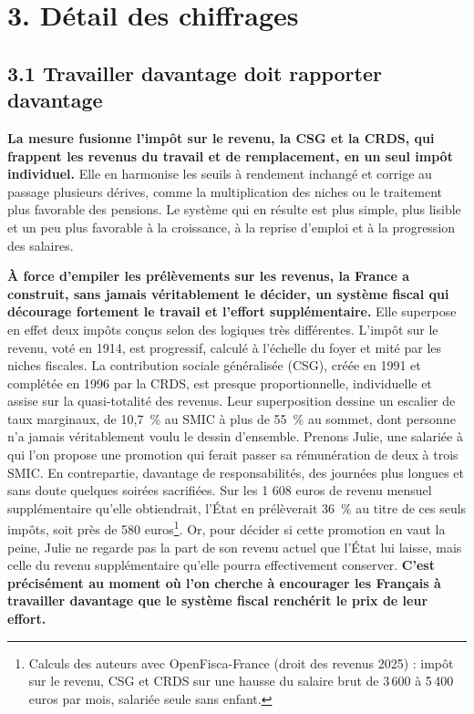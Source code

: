 \documentclass[10pt,a4paper]{article}
\begin{document}
\section{3. Détail des chiffrages}

\subsection{3.1 Travailler davantage doit rapporter davantage}

\textbf{La mesure fusionne l'impôt sur le revenu, la CSG et la CRDS, qui frappent les revenus du travail et de remplacement, en un seul impôt individuel.} Elle en harmonise les seuils à rendement inchangé et corrige au passage plusieurs dérives, comme la multiplication des niches ou le traitement plus favorable des pensions. Le système qui en résulte est plus simple, plus lisible et un peu plus favorable à la croissance, à la reprise d'emploi et à la progression des salaires.

\textbf{À force d’empiler les prélèvements sur les revenus, la France a construit, sans jamais véritablement le décider, un système fiscal qui décourage fortement le travail et l’effort supplémentaire.} Elle superpose en effet deux impôts conçus selon des logiques très différentes. L’impôt sur le revenu, voté en 1914, est progressif, calculé à l’échelle du foyer et mité par les niches fiscales. La contribution sociale généralisée (CSG), créée en 1991 et complétée en 1996 par la CRDS, est presque proportionnelle, individuelle et assise sur la quasi-totalité des revenus. Leur superposition dessine un escalier de taux marginaux, de 10,7~\% au SMIC à plus de 55~\% au sommet, dont personne n’a jamais véritablement voulu le dessin d’ensemble. Prenons Julie, une salariée à qui l’on propose une promotion qui ferait passer sa rémunération de deux à trois SMIC. En contrepartie, davantage de responsabilités, des journées plus longues et sans doute quelques soirées sacrifiées. Sur les 1 608 euros de revenu mensuel supplémentaire qu’elle obtiendrait, l’État en prélèverait 36~\% au titre de ces seuls impôts, soit près de 580 euros\footnote{Calculs des auteurs avec OpenFisca-France (droit des revenus 2025) : impôt sur le revenu, CSG et CRDS sur une hausse du salaire brut de 3\,600 à 5\,400 euros par mois, salariée seule sans enfant.}. Or, pour décider si cette promotion en vaut la peine, Julie ne regarde pas la part de son revenu actuel que l’État lui laisse, mais celle du revenu supplémentaire qu’elle pourra effectivement conserver. \textbf{C’est précisément au moment où l’on cherche à encourager les Français à travailler davantage que le système fiscal renchérit le prix de leur effort.}
\end{document}
